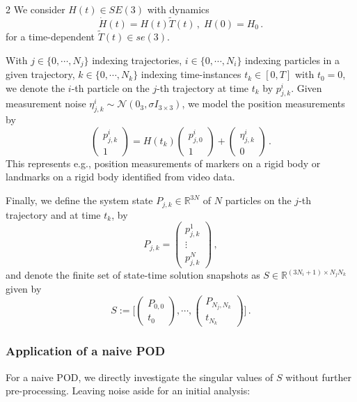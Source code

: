 \documentclass{article}
\newcommand{\R}{\mathbb{R}}                                 %
\newcommand{\pmat}[1]{\begin{pmatrix}#1\end{pmatrix}}
\begin{document}
\begin{multicols}{2}
We consider $H(t) \in SE(3)$ with dynamics 
\begin{equation}\label{eq:rigid-group-dynamics}
    \dot{H}(t) = H(t)\widetilde{T}(t)\,,\; H(0) = H_0\,.
\end{equation}
for a time-dependent $\widetilde{T}(t) \in se(3)$. 

With $j \in \{0,\cdots,N_j\}$ indexing trajectories, $i \in \{0,\cdots,N_i\}$ indexing particles in a given trajectory, $k \in \{0,\cdots,N_k\}$ indexing time-instances $t_k \in [0,T]$ with $t_0 = 0$, we denote the $i$-th particle on the $j$-th trajectory at time $t_k$ by $p^i_{j,k}$. Given measurement noise $\eta_{j,k}^{i} \sim \mathcal{N}(0_3, \sigma I_{3\times 3})$, we model the position measurements by
\begin{equation}\label{eq:rigid-pointcloud-dynamics}
    \pmat{p^i_{j,k} \\ 1} 
    = H(t_k) \pmat{p^i_{j,0} \\ 1} 
    + \pmat{\eta^i_{j,k} \\ 0}\,.
\end{equation}  
This represents e.g., position measurements of markers on a rigid body or landmarks on a rigid body identified from video data.

Finally, we define the system state $P_{j,k} \in \R^{3N}$ of $N$ particles on the $j$-th trajectory and at time $t_k$, by   
\begin{equation}\label{eq:rigid-pointcloud}
    P_{j,k} 
    = \pmat{p^1_{j,k} \\ \vdots \\ p^N_{j,k}}\,,
\end{equation}  
and denote the finite set of state-time solution snapshots as $S \in \R^{(3N_i+1)\times N_j N_k}$ given by
\begin{equation}\label{eq:snapshots-rigid-pointcloud}
    S := \bigg[\pmat{P_{0,0} \\ t_0}, \cdots, \pmat{P_{N_j,N_k}\\ t_{N_k}}\bigg] \,.
\end{equation}  

\subsubsection{Application of a naive POD}\label{sssec:naive-POD-rigid-pointcloud}
For a naive POD, we directly investigate the singular values of $S$ without further pre-processing. Leaving noise aside for an initial analysis:


\end{multicols}
\end{document}
